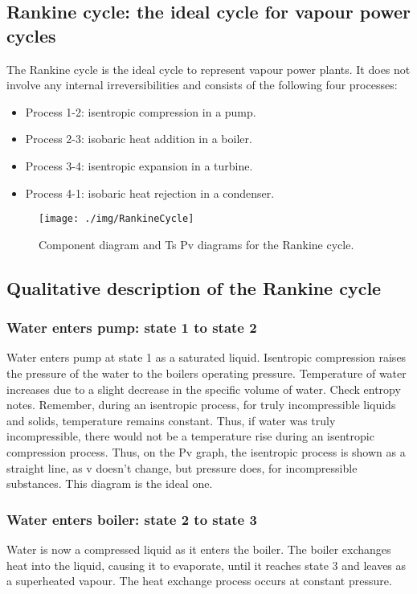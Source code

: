 \subsection{Rankine cycle: the ideal cycle for vapour power cycles}
The Rankine cycle is the ideal cycle to represent vapour power plants. It does not involve any internal irreversibilities and consists of the following four processes:
\begin{itemize}[noitemsep]
  \item Process 1-2: isentropic compression in a pump.
  \item Process 2-3: isobaric heat addition in a boiler.
  \item Process 3-4: isentropic expansion in a turbine.
  \item Process 4-1: isobaric heat rejection in a condenser.
\end{itemize}
\begin{figure}
  \centering
  \texttt{[image: ./img/RankineCycle]}
  \caption{Component diagram and Ts Pv diagrams for the Rankine cycle.}
\end{figure}
\subsection{Qualitative description of the Rankine cycle}
\subsubsection{Water enters pump: state 1 to state 2}
Water enters pump at state 1 as a saturated liquid. Isentropic compression raises the pressure of the water to the boilers operating pressure. Temperature of water increases due to a slight decrease in the specific volume of water. Check entropy notes. Remember, during an isentropic process, for truly incompressible liquids and solids, temperature remains constant. Thus, if water was truly incompressible, there would not be a temperature rise during an isentropic compression process. Thus, on the Pv graph, the isentropic process is shown as a straight line, as v doesn't change, but pressure does, for incompressible substances. This diagram is the ideal one.
\subsubsection{Water enters boiler: state 2 to state 3}
Water is now a compressed liquid as it enters the boiler. The boiler exchanges heat into the liquid, causing it to evaporate, until it reaches state 3 and leaves as a superheated vapour. The heat exchange process occurs at constant pressure.
